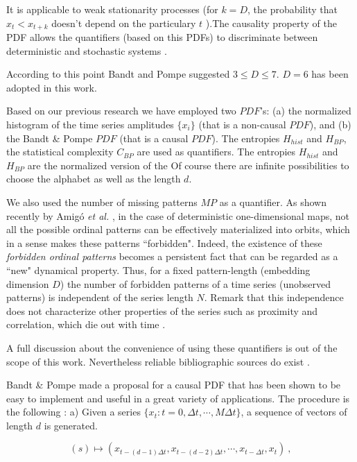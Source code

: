 It is applicable to weak stationarity processes (for $k=D$, the probability that $x_t < x_{t+k}$ doesn't depend on the particulary $t$ \cite{Pompe2002}).The causality property of the PDF allows the quantifiers (based on this PDFs) to discriminate between deterministic and stochastic systems \cite{Rosso2007B}.

According to this point Bandt and Pompe suggested $3\leq D \leq 7$. $D=6$ has been adopted in this work.

Based on our previous research \cite{DeMicco2008,DeMicco2009} we have employed two $PDF$'s: (a) the normalized histogram of the time series amplitudes $\{x_i\}$ (that is a non-causal $PDF$), and (b) the Bandt \& Pompe $PDF$ (that is a causal $PDF$).
The entropies $H_{hist}$ and $H_{BP}$, the statistical complexity $C_{BP}$ are used as quantifiers. The entropies $H_{hist}$ and $H_{BP}$ are the normalized version of the Of course there are infinite possibilities to choose the alphabet as well as the length $d$.

We also used the number of missing patterns $MP$ as a quantifier\cite{Rosso2012}.
As shown recently by Amig\'o {\it et al.} \cite{Amigo2006,Amigo2007,Amigo2008,Amigo2010}, in the case of deterministic one-dimensional maps, not all the possible ordinal patterns can be effectively materialized into orbits, which in a sense makes these patterns ``forbidden".
Indeed, the existence of these {\it forbidden ordinal patterns} becomes a persistent fact that can be regarded as a ``new" dynamical property.
Thus, for a fixed pattern-length (embedding dimension $D$) the number of forbidden patterns of a time series (unobserved patterns) is independent of the series length $N$.
Remark that this independence does not characterize other properties of the series such as proximity and correlation, which die out with time \cite{Amigo2007,Amigo2010}.

A full discussion about the convenience of using these quantifiers is out of the scope of this work.
Nevertheless reliable bibliographic sources do exist \cite{Wackerbauer1994,Lopez1995,Rosso2007A,DeMicco2008,Rosso2009,Martin2006,Rosso2012}.


Bandt \& Pompe made a proposal for a causal PDF that has been shown to be easy to implement and useful in a great variety of applications. The procedure is the
following \cite{Pompe2002,Keller2003,Keller2005}: a) Given a
series $\{x_t : t=0, \Delta t, \cdots,M\Delta t \}$, a sequence of
vectors of length $d$ is generated.

\begin{equation}
\label{eq:vectores}
(s)\mapsto \left(x_{t-(d-1)\Delta t},x_{t-(d-2)\Delta t},\cdots,x_{t-\Delta t},x_{t}\right) \ ,
\end{equation}

